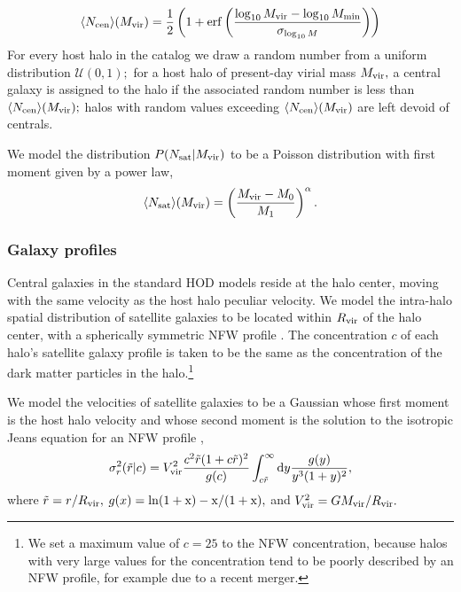 \documentclass[usenatbib,usegraphicx,letterpaper]{mn2e}
\newcommand{\mvir}{M_{\rm vir}}
\newcommand{\rvir}{R_{\rm vir}}
\newcommand{\nsat}{N_{\rm sat}}
\begin{document}
\begin{equation}
\label{eq:ncen}
\langle N_{\mathrm{cen}} \rangle(\mvir) =
        \frac{1}{2}\left( 1 +
        \mathrm{erf}\left( \frac{\log_{10}\mvir -
        \log_{10}M_{\rm min}}{\sigma_{\log_{10}M}} \right) \right)
\end{equation}
For every host halo in the catalog we draw a random number from a uniform distribution $\mathcal{U}(0, 1);$ for a host halo of present-day virial mass $\mvir,$ a central galaxy is assigned to the halo if the associated random number is less than $\langle N_{\mathrm{cen}} \rangle(\mvir);$ halos with random values exceeding  $\langle N_{\mathrm{cen}} \rangle(\mvir)$ are left devoid of centrals. 

We model the distribution $P(\nsat|\mvir)$ to be a Poisson distribution with first moment given by a power law, 
\begin{equation}
\label{eq:nsat}
\langle N_{\rm sat}\rangle(\mvir) = \left( \frac{\mvir - M_0}{M_1} \right)^{\alpha}. 
\end{equation}

\subsubsection{Galaxy profiles}

Central galaxies in the standard HOD models reside at the halo center, moving with the same velocity as the host halo peculiar velocity. We model the intra-halo spatial distribution of satellite galaxies to be located within $\rvir$ of the halo center, with a spherically symmetric NFW profile \citep{nfw97}. The concentration $c$ of each halo's satellite galaxy profile is taken to be the same as the concentration of the dark matter particles in the halo.\footnote{We set a maximum value of $c=25$ to the NFW concentration, because halos with very large values for the concentration tend to be poorly described by an NFW profile, for example due to a recent merger.}

We model the velocities of satellite galaxies to be a Gaussian whose first moment is the host halo velocity and whose second moment is the solution to the isotropic Jeans equation for an NFW profile \citep{more09b}, 
\begin{equation}
\sigma^{2}_{r}(\tilde{r}|c) = V_{\rm vir}^{2}\frac{c^{2}\tilde{r}(1 + c\tilde{r})^{2}}{g(c)}\int_{c\tilde{r}}^{\infty}{\rm d}y\frac{g(y)}{y^{3}(1 + y)^{2}}, 
\end{equation}
where $\tilde{r} = r/\rvir,$ $g(x) = \rm{ln}(1+x) - x / (1+x),$ and $V_{\rm vir}^{2} = G\mvir/\rvir.$
\end{document}
